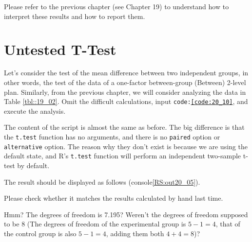 \documentclass{ltjsbook}
\begin{document}
Please refer to the previous chapter (see Chapter 19) to understand how to interpret these results and how to report them.

\section{Untested T-Test}
Let's consider the test of the mean difference between two independent groups, in other words, the test of the data of a one-factor between-group (Between) 2-level plan. Similarly, from the previous chapter, we will consider analyzing the data in Table \ref{tbl::19_02}. Omit the difficult calculations, input \texttt{code:\ref{code:20_10}}, and execute the analysis.

The content of the script is almost the same as before. The big difference is that the \texttt{t.test} function has no arguments, and there is no \texttt{paired} option or \texttt{alternative} option. The reason why they don't exist is because we are using the default state, and R's \texttt{t.test} function will perform an independent two-sample t-test by default.

The result should be displayed as follows (console\ref{RS:out20_05}).

Please check whether it matches the results calculated by hand last time.

Hmm? The degrees of freedom is 7.195? Weren't the degrees of freedom supposed to be 8 (The degrees of freedom of the experimental group is $5-1=4$, that of the control group is also $5-1=4$, adding them both $4+4=8$)?
\end{document}
